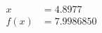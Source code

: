 \documentclass[preview]{standalone}
\begin{document}
\begin{align*}
x &= 4.8977\\f(x) &= 7.9986850
\end{align*}
\end{document}

